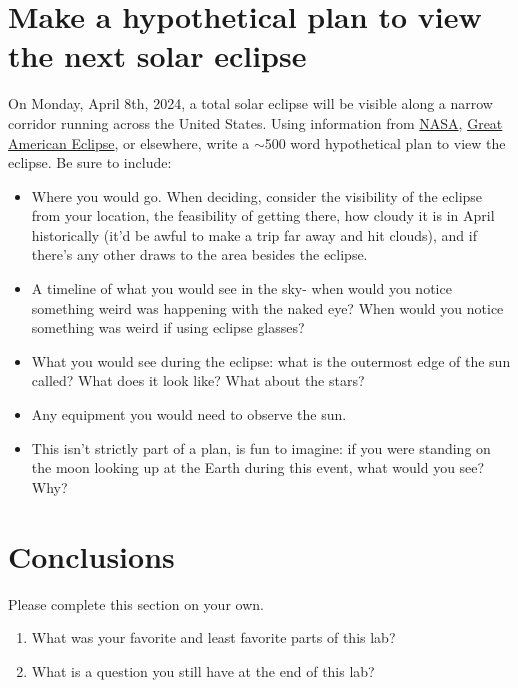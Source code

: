 \documentclass[11pt]{article}
\begin{document}

\section{Make a hypothetical plan to view the next solar eclipse}
On Monday, April 8th, 2024, a total solar eclipse will be visible along a narrow corridor running across the United States. Using information from \href{https://solarsystem.nasa.gov/eclipses/2024/apr-8-total/overview/}{NASA},  \href{https://www.greatamericaneclipse.com/future}{Great American Eclipse}, or elsewhere, write a $\sim$500 word hypothetical plan to view the eclipse. Be sure to include:
\begin{itemize}
    \item Where you would go. When deciding, consider the visibility of the eclipse from your location, the feasibility of getting there, how cloudy it is in April historically (it'd be awful to make a trip far away and hit clouds), and if there's any other draws to the area besides the eclipse.
    \item A timeline of what you would see in the sky- when would you notice something weird was happening with the naked eye? When would you notice something was weird if using eclipse glasses?    \item What you would see during the eclipse: what is the outermost edge of the sun called? What does it look like? What about the stars?
    \item Any equipment you would need to observe the sun.
    \item This isn't strictly part of a plan, is fun to imagine: if you were standing on the moon looking up at the Earth during this event, what would you see? Why?
\end{itemize}


\section{Conclusions}
\noindent Please complete this section on your own.
\begin{enumerate}

\item What was your favorite and least favorite parts of this lab?

\item What is a question you still have at the end of this lab?

\end{enumerate}
\end{document}
